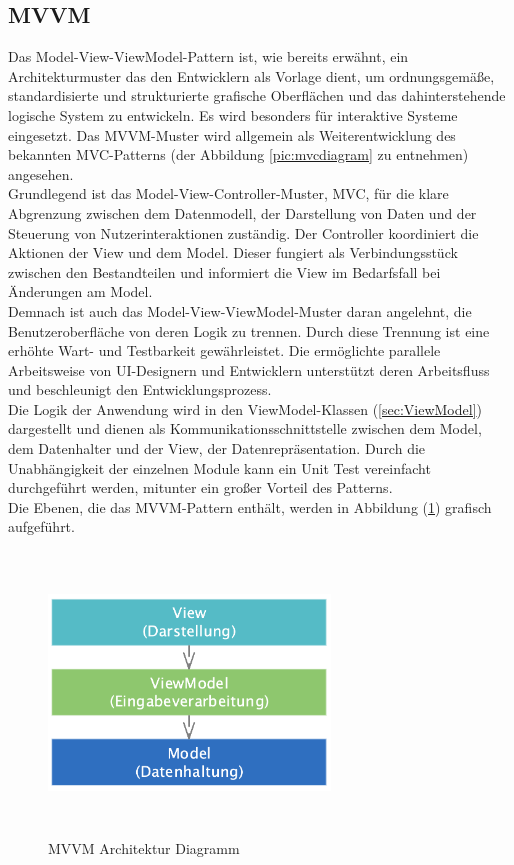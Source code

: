 \subsection{MVVM}
\label{chap:MVVM}
Das Model-View-ViewModel-Pattern ist, wie bereits erwähnt, ein Architekturmuster das den Entwicklern als Vorlage dient, um ordnungsgemäße, 
standardisierte und strukturierte grafische Oberflächen und das dahinterstehende logische System zu entwickeln. Es wird besonders für 
interaktive Systeme eingesetzt. Das MVVM-Muster wird allgemein als Weiterentwicklung des bekannten MVC-Patterns (der Abbildung \ref{pic:mvcdiagram} zu entnehmen) angesehen. 
\\
Grundlegend ist das Model-View-Controller-Muster, MVC, für die klare Abgrenzung zwischen dem Datenmodell, der Darstellung von Daten und der Steuerung von 
Nutzerinteraktionen zuständig. Der Controller koordiniert die Aktionen der View und dem Model. Dieser fungiert als Verbindungsstück zwischen den Bestandteilen und informiert 
die View im Bedarfsfall bei Änderungen am Model. 
\\ 
\linebreak
Demnach ist auch das Model-View-ViewModel-Muster daran angelehnt, die Benutzeroberfläche von deren Logik zu trennen. Durch diese Trennung 
ist eine erhöhte Wart- und Testbarkeit gewährleistet. Die ermöglichte parallele Arbeitsweise von UI-Designern und Entwicklern 
unterstützt deren Arbeitsfluss und beschleunigt den Entwicklungsprozess. \cite{mvvmentwickler.2010s} 
\\ 
\linebreak
Die Logik der Anwendung wird in den ViewModel-Klassen (\ref{sec:ViewModel}) dargestellt und dienen als Kommunikationsschnittstelle zwischen 
dem Model, dem Datenhalter und der View, der Datenrepräsentation. Durch die Unabhängigkeit der einzelnen Module kann ein Unit Test vereinfacht 
durchgeführt werden, mitunter ein großer Vorteil des Patterns. 
\\ 
Die Ebenen, die das MVVM-Pattern enthält, werden in Abbildung (\ref{pic:mvvmdiagram}) grafisch aufgeführt.
\begin{figure}[hbt!]
    \centering
    \includegraphics[width=7.5cm,height=7.5cm,keepaspectratio]{2GrundlagenX/Bilder/mvvmDiagramm.png}
    \caption{MVVM Architektur Diagramm \cite{mvvmDiagramm.2015n}}
    \label{pic:mvvmdiagram}
\end{figure} 
